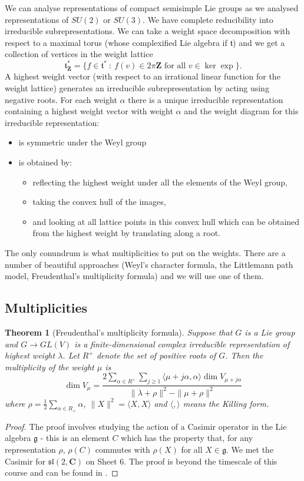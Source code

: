 \documentclass[12pt]{article}
\newcommand{\CC}{\mathbf{C}}
\newcommand{\ZZ}{\mathbf{Z}}
\newtheorem{thm}{Theorem}[section]
\theoremstyle{definition}
\theoremstyle{check}
\theoremstyle{remark}
\theoremstyle{TheoremNum}
\begin{document}
We can analyse representations of compact semisimple Lie groups as we analysed representations of $SU(2)$ or $SU(3)$. We have complete reducibility into irreducible subrepresentations. We can take a weight space decomposition with respect to a maximal torus (whose complexified Lie algebra if $\mathfrak{t}$) and we get a collection of vertices in the weight lattice
\[\mathfrak{t}^*_{\ZZ}=\{f\in\mathfrak{t}^*\ :\ f(v)\in 2\pi\ZZ\mbox{ for all }v\in\ker\exp\}.\]
A highest weight vector (with respect to an irrational linear function for the weight lattice) generates an irreducible subrepresentation by acting using negative roots. For each weight $\alpha$ there is a unique irreducible representation containing a highest weight vector with weight $\alpha$ and the weight diagram for this irreducible representation:
\begin{itemize}
\item is symmetric under the Weyl group
\item is obtained by:
\begin{itemize}
\item reflecting the highest weight under all the elements of the Weyl group,
\item taking the convex hull of the images,
\item and looking at all lattice points in this convex hull which can be obtained from the highest weight by translating along a root.
\end{itemize}
\end{itemize}
The only conundrum is what multiplicities to put on the weights. There are a number of beautiful approaches (Weyl's character formula, the Littlemann path model, Freudenthal's multiplicity formula) and we will use one of them.

\subsection{Multiplicities}

\begin{thm}[Freudenthal's multiplicity formula]
Suppose that $G$ is a Lie group and $G\to GL(V)$ is a finite-dimensional complex irreducible representation of highest weight $\lambda$. Let $R^+$ denote the set of positive roots of $G$. Then the multiplicity of the weight $\mu$ is
\[\dim V_{\mu}=\frac{2\sum_{\alpha\in R^+}\sum_{j\geq 1}\langle\mu+j\alpha,\alpha\rangle\dim V_{\mu+j\alpha}}{\|\lambda+\rho\|^2-\|\mu+\rho\|^2}\]
where $\rho=\frac{1}{2}\sum_{\alpha\in R_+}\alpha$, $\|X\|^2=\langle X,X\rangle$ and $\langle,\rangle$ means the Killing form.
\end{thm}
\begin{proof}
The proof involves studying the action of a Casimir operator in the Lie algebra $\mathfrak{g}$ - this is an element $C$ which has the property that, for any representation $\rho$, $\rho(C)$ commutes with $\rho(X)$ for all $X\in\mathfrak{g}$. We met the Casimir for $\mathfrak{sl}(2,\CC)$ on Sheet 6. The proof is beyond the timescale of this course and can be found in {\cite[Chapter 25.1]{FultonHarris}}.
\end{proof}

\appendix

{}

\end{document}
